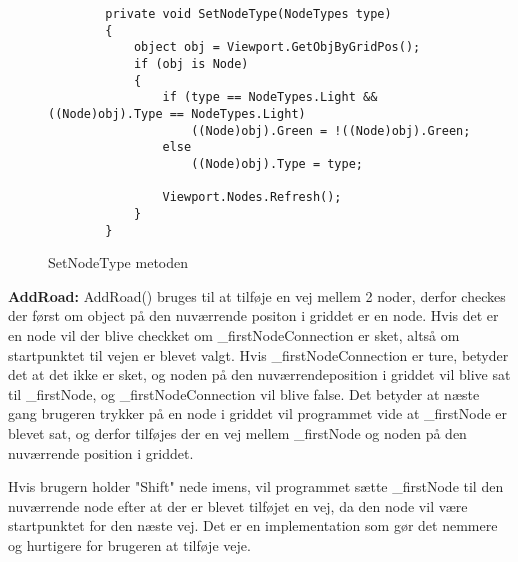 \begin{figure}[H]
\begin{lstlisting}
        private void SetNodeType(NodeTypes type)
        {
            object obj = Viewport.GetObjByGridPos();
            if (obj is Node)
            {
                if (type == NodeTypes.Light && ((Node)obj).Type == NodeTypes.Light)
                    ((Node)obj).Green = !((Node)obj).Green;
                else
                    ((Node)obj).Type = type;

                Viewport.Nodes.Refresh();
            }
        }
\end{lstlisting}
\caption{SetNodeType metoden}\label{SetNodeTypeCode}
\end{figure}

\vspace{5mm}


\textbf{AddRoad:} \newline
AddRoad() bruges til at tilføje en vej mellem 2 noder, derfor checkes der først om object på den nuværrende positon i griddet er en node. Hvis det er en node vil der blive checkket om _firstNodeConnection er sket, altså om startpunktet til vejen er blevet valgt. Hvis _firstNodeConnection er ture, betyder det at det ikke er sket, og noden på den nuværrendeposition i griddet vil blive sat til _firstNode, og _firstNodeConnection vil blive false. Det betyder at næste gang brugeren trykker på en node i griddet vil programmet vide at _firstNode er blevet sat, og derfor tilføjes der en vej mellem _firstNode og noden på den nuværrende position i griddet.

Hvis brugern holder "Shift" nede imens, vil programmet sætte _firstNode til den nuværrende node efter at der er blevet tilføjet en vej, da den node vil være startpunktet for den næste vej. Det er en implementation som gør det nemmere og hurtigere for brugeren at tilføje veje. 


